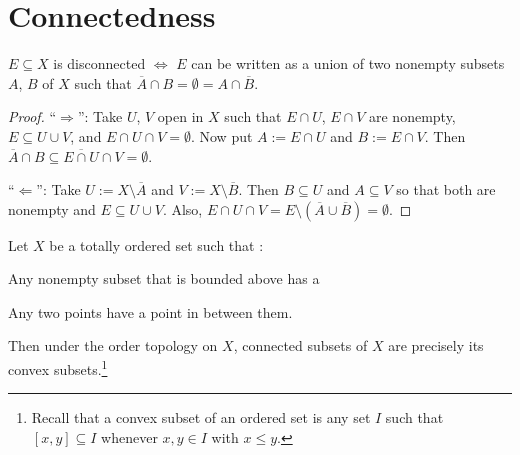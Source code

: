 	
	
	
\section{Connectedness}

	\begin{lem}
		$E\subseteq X$ is disconnected $\iff$ $E$ can be written as a union of two nonempty subsets $A$, $B$ of $X$ such that $\overline A\cap B = \emptyset = A\cap\overline B$.
	\end{lem}
	
	\begin{proof}
		``$\Rightarrow$'': Take $U$, $V$ open in $X$ such that $E\cap U$, $E\cap V$ are nonempty, $E\subseteq U\cup V$, and $E\cap U\cap V = \emptyset$. Now put $A := E\cap U$ and $B := E\cap V$. Then $\overline A\cap B\subseteq \overline{E\cap U}\cap V = \emptyset$.
		
		``$\Leftarrow$'': Take $U := X\setminus \overline A$ and $V := X\setminus \overline B$. Then $B\subseteq U$ and $A\subseteq V$ so that both are nonempty and $E\subseteq U\cup V$. Also, $E\cap U\cap V = E\setminus(\overline A\cup\overline B) = \emptyset$.
	\end{proof}
	
	\begin{prp}\label{PRP: linear continua re connected}
		Let $X$ be a totally ordered set such that \tfh:
		\begin{assmplist}
			\item Any nonempty subset that is bounded above has a \lub
			\item Any two points have a point in between them.
		\end{assmplist}
		Then under the order topology on $X$, connected subsets of $X$ are precisely its convex subsets.\footnote{Recall that a convex subset of an ordered set is any set $I$ such that $[x, y]\subseteq I$ whenever $x, y\in I$ with $x\le y$.}
	\end{prp}
	
